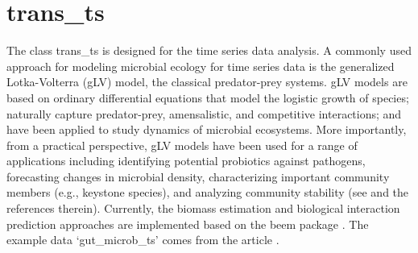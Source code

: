 \documentclass[
]{book}
\newenvironment{Shaded}{\begin{snugshade}}{\end{snugshade}}
\newcommand{\AttributeTok}[1]{\textcolor[rgb]{0.77,0.63,0.00}{#1}}
\newcommand{\CommentTok}[1]{\textcolor[rgb]{0.56,0.35,0.01}{\textit{#1}}}
\newcommand{\FunctionTok}[1]{\textcolor[rgb]{0.00,0.00,0.00}{#1}}
\newcommand{\NormalTok}[1]{#1}
\newcommand{\OtherTok}[1]{\textcolor[rgb]{0.56,0.35,0.01}{#1}}
\newcommand{\SpecialCharTok}[1]{\textcolor[rgb]{0.00,0.00,0.00}{#1}}
\newcommand{\StringTok}[1]{\textcolor[rgb]{0.31,0.60,0.02}{#1}}
\begin{document}
\begin{Shaded}
\end{Shaded}

\hypertarget{trans_ts}{%
\section{trans\_ts}\label{trans_ts}}

The class trans\_ts is designed for the time series data analysis.
A commonly used approach for modeling microbial ecology for time series data is the generalized Lotka-Volterra (gLV) model, the classical predator-prey systems.
gLV models are based on ordinary differential equations that model the logistic growth of species;
naturally capture predator-prey, amensalistic, and competitive interactions; and have been applied to study dynamics of microbial ecosystems.
More importantly, from a practical perspective, gLV models have been used for a range of applications including identifying potential probiotics
against pathogens, forecasting changes in microbial density, characterizing important community members (e.g., keystone species),
and analyzing community stability (see \citep{Li_expectation_2019} and the references therein).
Currently, the biomass estimation and biological interaction prediction approaches are implemented based on the beem package \citep{Li_expectation_2019}.
The example data `gut\_microb\_ts' comes from the article \citep{Gibbons_twodynamic_2017}.
\end{document}

